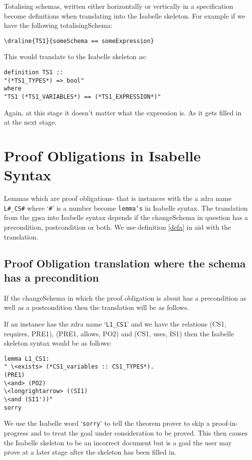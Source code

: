 Totalising schemas, written either horizontally or vertically in a specification
become definitions when translating into the Isabelle skeleton. For example if
we have the following totalisingSchema:

\verb|\draline{TS1}{someSchema == someExpression}|

This would translate to the Isabelle skeleton as:

\begin{verbatim}
definition TS1 ::
"(*TS1_TYPES*) => bool"
where
"TS1 (*TS1_VARIABLES*) == (*TS1_EXPRESSION*)"
\end{verbatim}

Again, at this stage it doesn't matter what the expression is. As it gets filled
in at the next stage.

\section{Proof Obligations in Isabelle Syntax}

Lemmas which are proof obligations- that is instances with the a \gls{zdra} name
\texttt{L\#\_CS\#} where `\texttt{\#}' is a number become \texttt{lemma's} in
Isabelle syntax. The translation from the \gls{gpsa} into Isabelle syntax
depends if the changeSchema in question has a precondition, postcondition or
both. We use definition \ref{defa} in aid with the translation.

\subsection{Proof Obligation translation where the schema has a precondition}

If the changeSchema in which the proof obligation is about has a precondition as
well as a postcondition then the translation will be as follows. 

If an instance has the \gls{zdra} name `\texttt{L1\_CS1}' and we have the
relations (CS1, requires, PRE1), (PRE1, allows, PO2) and (CS1, uses, IS1) then
the Isabelle skeleton syntax would be as follows:

\begin{verbatim}
lemma L1_CS1:
" \<exists> (*CS1_variables :: CS1_TYPES*).
(PRE1)
\<and> (PO2)
\<longrightarrow> ((SI1)
\<and (SI1'))"
sorry
\end{verbatim}

We use the Isabelle word `\texttt{sorry}' to tell the theorem prover to skip a
proof-in-progress and to treat the goal under consideration to be proved. This
then causes the Isabelle skeleton to be an incorrect document but is a goal the
user may prove at a later stage after the skeleton has been filled in.

